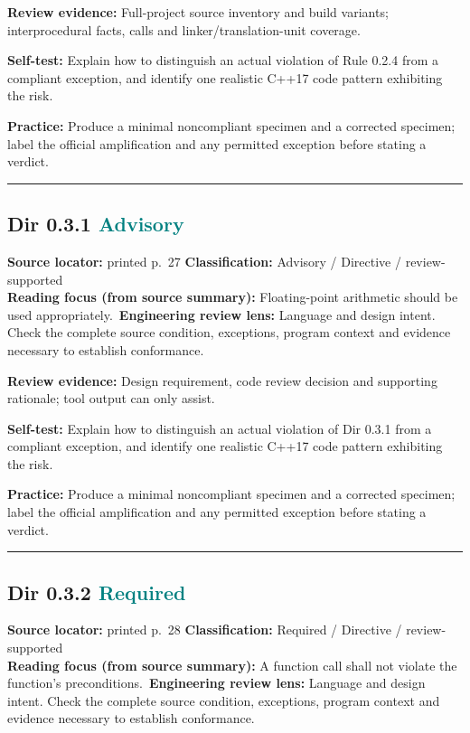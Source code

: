 \documentclass[10pt,letterpaper]{article}
\begin{document}
\textbf{Review evidence:} Full-project source inventory and build variants; interprocedural facts, calls and linker/translation-unit coverage.

\textbf{Self-test:} Explain how to distinguish an actual violation of Rule 0.2.4 from a compliant exception, and identify one realistic C++17 code pattern exhibiting the risk.\par
\textbf{Practice:} Produce a minimal noncompliant specimen and a corrected specimen; label the official amplification and any permitted exception before stating a verdict.
\smallskip\hrule\smallskip
\subsection*{Dir 0.3.1 \enspace \texorpdfstring{\small\textcolor{teal}{Advisory}}{Advisory}}
\noindent\textbf{Source locator:} printed p.~27 \quad\textbf{Classification:} Advisory / Directive / review-supported\\
\textbf{Reading focus (from source summary):} Floating-point arithmetic should be used appropriately.\
\textbf{Engineering review lens:} Language and design intent. Check the complete source condition, exceptions, program context and evidence necessary to establish conformance.

\textbf{Review evidence:} Design requirement, code review decision and supporting rationale; tool output can only assist.

\textbf{Self-test:} Explain how to distinguish an actual violation of Dir 0.3.1 from a compliant exception, and identify one realistic C++17 code pattern exhibiting the risk.\par
\textbf{Practice:} Produce a minimal noncompliant specimen and a corrected specimen; label the official amplification and any permitted exception before stating a verdict.
\smallskip\hrule\smallskip
\subsection*{Dir 0.3.2 \enspace \texorpdfstring{\small\textcolor{teal}{Required}}{Required}}
\noindent\textbf{Source locator:} printed p.~28 \quad\textbf{Classification:} Required / Directive / review-supported\\
\textbf{Reading focus (from source summary):} A function call shall not violate the function's preconditions.\
\textbf{Engineering review lens:} Language and design intent. Check the complete source condition, exceptions, program context and evidence necessary to establish conformance.
\end{document}
